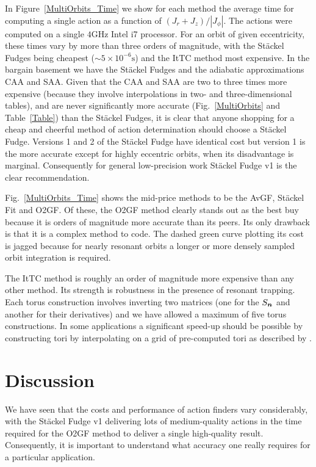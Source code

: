 \documentclass[useAMS,usenatbib,fleqn,a4paper]{mn2e}
\newcommand{\bs}[1]{\bmath{#1}}
\begin{document}
In Figure~\ref{MultiOrbits_Time} we show for each method the average time for
computing a single action as a function of $(J_r+J_z)/|J_\phi|$. The actions were computed on a single $4\mathrm{GHz}$ Intel i7 processor. For an orbit
of given eccentricity, these times vary by more than three orders of
magnitude, with the St\"ackel Fudges being cheapest ($\sim5\times10^{-6}\mathrm{s}$)
and the ItTC method most expensive. In the bargain basement we have
the St\"ackel Fudges and the adiabatic approximations CAA and SAA.  Given
that the CAA and SAA are two to three times more expensive (because they
involve interpolations in two- and three-dimensional tables), and are never
significantly more accurate (Fig.~\ref{MultiOrbits} and Table~\ref{Table})
than the St\"ackel Fudges, it is clear that anyone shopping for a cheap and
cheerful method of action determination should choose a St\"ackel Fudge.
Versions 1 and 2 of the St\"ackel Fudge have identical cost but version 1 is
the more accurate except for highly eccentric orbits, when its disadvantage
is marginal. Consequently for general low-precision work St\"ackel Fudge v1
is the clear recommendation.

Fig.~\ref{MultiOrbits_Time} shows the mid-price methods to be the AvGF,
St\"ackel Fit and O2GF. Of these, the O2GF method clearly stands out as the
best buy because it is orders of magnitude more accurate than its peers. Its
only drawback is that it is a complex method to code. The dashed green curve
plotting its cost is jagged because for nearly resonant orbits a longer or
more densely sampled orbit integration is required.

The ItTC method is roughly an order of magnitude more expensive than
any other method. Its strength is robustness in the presence of resonant
trapping.  Each torus construction involves inverting two matrices (one for
the $S_{\bs{n}}$ and another for their derivatives) and we have allowed a
maximum of five torus constructions.  In some applications a significant
speed-up should be possible by  constructing tori by interpolating on a grid
of pre-computed tori as described by \cite{BinneyMcMillan2015}.

\section{Discussion}\label{Sect::Discuss}

We have seen that the costs and performance of action finders vary
considerably, with the St\"ackel Fudge v1 delivering lots of medium-quality
actions in the time required for the O2GF method to deliver a single
high-quality result. Consequently, it is important to understand what
accuracy one really requires for a particular application.
\end{document}
